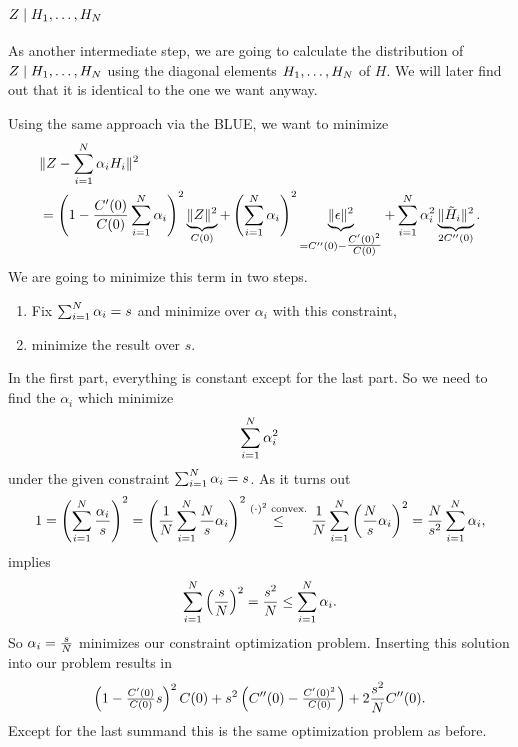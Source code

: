 \subsection{\texorpdfstring{\(Z\mid H_1,\dots,H_N\)}{Z|H1,...,HN}}

As another intermediate step, we are going to calculate the distribution of
\(Z\mid H_1,\dots,H_N\) using the diagonal elements
\(H_1,\dots,H_N\) of \(H\). We will later find out that it is identical
to the one we want anyway.

Using the same approach via the BLUE, we want to minimize
\[
	\begin{aligned}
	&\|Z - \sum_{i=1}^N\alpha_i H_i \|^2\\
	&= \left(1- \frac{C'(0)}{C(0)}\sum_{i=1}^N \alpha_i\right)^2
	\underbrace{\|Z\|^2}_{C(0)}
	+  \left(\sum_{i=1}^N \alpha_i\right)^2 \underbrace{\|\epsilon\|^2}_{
		=C''(0)-\tfrac{C'(0)^2}{C(0)}
	}
	+ \sum_{i=1}^N \alpha_i^2 \underbrace{\|\tilde{H}_i\|^2}_{2C''(0)}.
	\end{aligned}
\]
We are going to minimize this term in two steps.
\begin{enumerate}
	\item Fix \(\sum_{i=1}^N \alpha_i = s\) and minimize over
	\(\alpha_i\) with this constraint,
	\item minimize the result over \(s\).
\end{enumerate}
In the first part, everything is constant except for the last part. So
we need to find the \(\alpha_i\) which minimize
\[
	\sum_{i=1}^N \alpha_i^2
\]
under the given constraint \(\sum_{i=1}^N \alpha_i = s\). As it turns
out
\[
	1 = \left(\sum_{i=1}^N \frac{\alpha_i}s\right)^2
	= \left(\frac1{N}\sum_{i=1}^N \frac{N}{s}\alpha_i\right)^2
	\overset{(\cdot)^2 \text{ convex.}}\le \frac1{N} \sum_{i=1}^N 
	\left(\frac{N}{s}\alpha_i\right)^2
	= \frac{N}{s^2} \sum_{i=1}^N \alpha_i,
\]
implies
\[
	\sum_{i=1}^N \left(\frac{s}{N}\right)^2 = \frac{s^2}{N}
	\le \sum_{i=1}^N \alpha_i.
\]
So \(\alpha_i=\frac{s}{N}\) minimizes our constraint optimization problem.
Inserting this solution into our problem results in
\[
	\left(1- \tfrac{C'(0)}{C(0)}s\right)^2
	C(0)
	+  s^2 \left(
		C''(0)-\tfrac{C'(0)^2}{C(0)}
	\right)
	+ 2\frac{s^2}{N} C''(0).
\]
Except for the last summand this is the same optimization problem as before.
